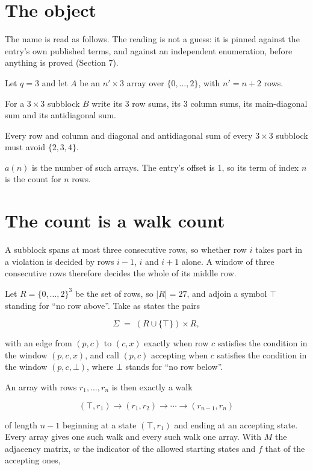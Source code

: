 \documentclass[11pt]{article}
\theoremstyle{definition}
\begin{document}
\section{The object}

The name is read as follows. The reading is not a guess: it is pinned against the entry's own published terms, and against an independent enumeration, before anything is proved (Section 7).

Let $q = 3$ and let $A$ be an $n' \times 3$ array over $\{0,\dots,2\}$, with $n' = n + 2$ rows.

For a $3\times3$ subblock $B$ write its 3 row sums, its 3 column sums, its main-diagonal sum and its antidiagonal sum.

Every row and column and diagonal and antidiagonal sum of every $3\times3$ subblock must avoid $\{2, 3, 4\}$.

$a(n)$ is the number of such arrays. The entry's offset is 1, so its term of index $n$ is the count for $n$ rows.

\section{The count is a walk count}

A subblock spans at most three consecutive rows, so whether row $i$ takes part in a violation is decided by rows $i-1$, $i$ and $i+1$ alone. A window of three consecutive rows therefore decides the whole of its middle row.

Let $R = \{0,\dots,2\}^{3}$ be the set of rows, so $|R| = 27$, and adjoin a symbol $\top$ standing for ``no row above''. Take as states the pairs

\[\Sigma \;=\; (R \cup \{\top\}) \times R,\]

with an edge from $(p,c)$ to $(c,x)$ exactly when row $c$ satisfies the condition in the window $(p,c,x)$, and call $(p,c)$ accepting when $c$ satisfies the condition in the window $(p,c,\bot)$, where $\bot$ stands for ``no row below''.

An array with rows $r_1,\dots,r_n$ is then exactly a walk

\[(\top,r_1) \to (r_1,r_2) \to \cdots \to (r_{n-1},r_n)\]

of length $n-1$ beginning at a state $(\top,r_1)$ and ending at an accepting state. Every array gives one such walk and every such walk one array. With $M$ the adjacency matrix, $w$ the indicator of the allowed starting states and $f$ that of the accepting ones,
\end{document}
